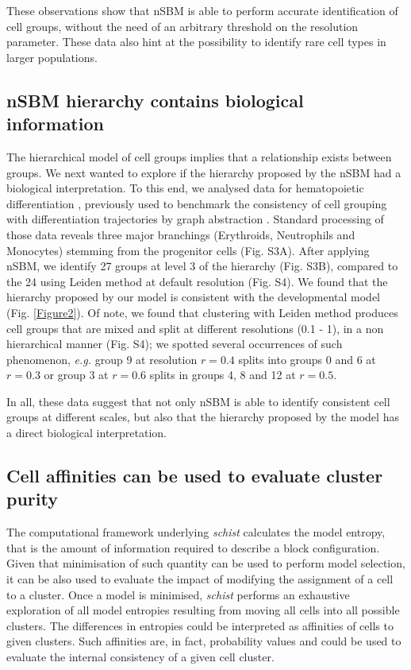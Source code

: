 \documentclass{bmcart}
\begin{document}
These observations show that nSBM is able to perform accurate identification of cell groups, without the need of an arbitrary threshold on the resolution parameter. These data also hint at the possibility to identify rare cell types in larger populations.

\subsection*{nSBM hierarchy contains biological information}
The hierarchical model of cell groups implies that a relationship exists between groups. We next wanted to explore if the hierarchy proposed by the nSBM had a biological interpretation. To this end, we analysed data for hematopoietic differentiation \cite{paul_2015}, previously used to benchmark the consistency of cell grouping with differentiation trajectories by graph abstraction \cite{wolf_2019}. Standard processing of those data reveals three major branchings (Erythroids, Neutrophils and Monocytes) stemming from the progenitor cells (Fig. S3A). After applying nSBM, we identify 27 groups at level 3 of the hierarchy (Fig. S3B), compared to the 24 using Leiden method at default resolution (Fig. S4). We found that the hierarchy proposed by our model is consistent with the developmental model (Fig. \ref{Figure2}). Of note, we found that clustering with Leiden method produces cell groups that are mixed and split at different resolutions (0.1 - 1), in a non hierarchical manner (Fig. S4); we spotted several occurrences of such phenomenon, \emph{e.g.} group 9 at resolution $r=0.4$ splits into groups 0 and 6 at $r=0.3$ or group 3 at $r=0.6$ splits in groups 4, 8 and 12 at $r=0.5$.

In all, these data suggest that not only nSBM is able to identify consistent cell groups at different scales, but also that the hierarchy proposed by the model has a direct biological interpretation.

\subsection*{Cell affinities can be used to evaluate cluster purity}
The computational framework underlying \emph{schist} calculates the model entropy, that is the amount of information required to describe a block configuration. Given that minimisation of such quantity can be used to perform model selection, it can be also used to evaluate the impact of modifying the assignment of a cell to a cluster. Once a model is minimised, \emph{schist} performs an exhaustive exploration of all model entropies resulting from moving all cells into all possible clusters. The differences in entropies could be interpreted as affinities of cells to given clusters. Such affinities are, in fact, probability values and could be used to evaluate the internal consistency of a given cell cluster. 
\end{document}
